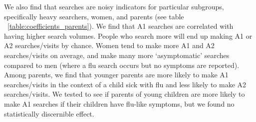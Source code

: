 \documentclass[12pt]{article}
\begin{document}



We also find that searches are noisy indicators for particular subgroups, specifically heavy searchers, women, and parents (see table ~\ref{table:coefficients_parents}). We find that A1 searches are correlated with having higher search volumes. People who search more will end up making A1 or A2 searches/visits by chance. Women tend to make more A1 and A2 searches/visits on average, and make many more `asymptomatic' searches compared to men (where a flu search occurs but no symptoms are reported). Among parents, we find that younger parents are more likely to make A1 searches/visits in the context of a child sick with flu and less likely to make A2 searches/visits. We tested to see if parents of young children are more likely to make A1 searches if their children have flu-like symptoms, but we found no statistically discernible effect.%
\end{document}
